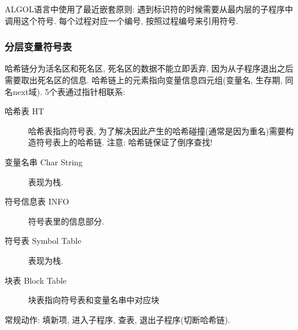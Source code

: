             ALGOL语言中使用了\textsf{最近嵌套原则}: 遇到标识符的时候需要从最内层的子程序中调用这个符号. 每个过程对应一个编号, 按照过程编号来引用符号.

            \subsubsection{分层变量符号表} 
            
                哈希链分为活名区和死名区, 死名区的数据不能立即丢弃, 因为从子程序退出之后需要取出死名区的信息. 哈希链上的元素指向变量信息四元组(变量名, 生存期, 同名next域). 5个表通过指针相联系:
                \begin{description}
                    \item[哈希表 HT] 哈希表指向符号表, 为了解决因此产生的哈希碰撞(通常是因为重名)需要构造符号表上的哈希链. 
                        注意: 哈希链保证了倒序查找!
                    \item[变量名串 Char String] 表现为栈.
                    \item[符号信息表 INFO] 符号表里的信息部分.
                    \item[符号表 Symbol Table] 表现为栈.
                    \item[块表 Block Table] 块表指向符号表和变量名串中对应块
                \end{description}
                
                常规动作: 填新项, 进入子程序, 查表, 退出子程序(切断哈希链).
